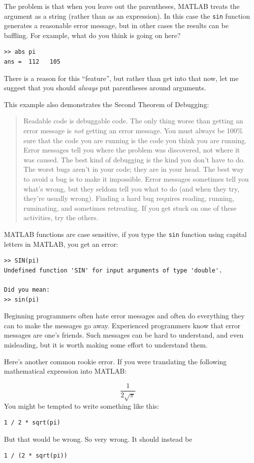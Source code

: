 \documentclass[
]{book}
\newcommand{\displaythrm}[1]{%
    \ifthenelse{\equal{#1}{1}}%
        {Readable code is debuggable code.}{%
    \ifthenelse{\equal{#1}{2}}%
        {The only thing worse than getting an error message is {\em
         not} getting an error message.}{%
    \ifthenelse{\equal{#1}{3}}%
        {You must always be 100\% sure that the code you are running
         is the code you think you are running.}{%
    \ifthenelse{\equal{#1}{4}}%
        {Error messages tell you where the problem was discovered,
         not where it was caused.}{%
    \ifthenelse{\equal{#1}{5}}%
        {The best kind of debugging is the kind you don't have to do.}{%
    \ifthenelse{\equal{#1}{6}}%
        {The worst bugs aren't in your code; they are in your head.}{%
    \ifthenelse{\equal{#1}{7}}%
        {The best way to avoid a bug is to make it impossible.}{%
    \ifthenelse{\equal{#1}{8}}%
        {Error messages sometimes tell you what's wrong, but they
         seldom tell you what to do (and when they try, they're usually
         wrong).}{%
    \ifthenelse{\equal{#1}{9}}%
        {Finding a hard bug requires reading, running, ruminating,
         and sometimes retreating.  If you get stuck on one of these
         activities, try the others.}{%
    {}%
}}}}}}}}}}%
\begin{document}
The problem is that when you leave out the parentheses, MATLAB treats
the argument as a string (rather than as an expression).  In
this case the {\tt sin} function generates a reasonable error message,
but in other cases the results can be baffling.  For example, what
do you think is going on here?

\begin{verbatim}
>> abs pi
ans =  112   105
\end{verbatim}

There is a reason for this ``feature'', but rather than get into that
now, let me suggest that you should {\em always} put parentheses around
arguments.

This example also demonstrates the Second Theorem of Debugging:

\begin{quote}
\displaythrm{2}
\end{quote}

MATLAB functions are case sensitive, if you type the {\tt sin} function using capital letters
in MATLAB, you get an error:

\begin{verbatim}
>> SIN(pi)
Undefined function 'SIN' for input arguments of type 'double'.

Did you mean:
>> sin(pi)
\end{verbatim}

Beginning programmers often hate error messages and often do everything they
can to make the messages go away.  Experienced programmers know that error
messages are one's friends.  Such messages can be hard to understand, and even
misleading, but it is worth making some effort to understand them.

Here's another common rookie error.  If you were translating
the following mathematical
expression into MATLAB:

\begin{equation}
 \frac{1}{2 \sqrt \pi}
\end{equation}
You might be tempted to write something like this:

\begin{verbatim}
1 / 2 * sqrt(pi)
\end{verbatim}

But that would be wrong.  So very wrong.  It should instead be

\begin{verbatim}
1 / (2 * sqrt(pi))
\end{verbatim}
\end{document}
